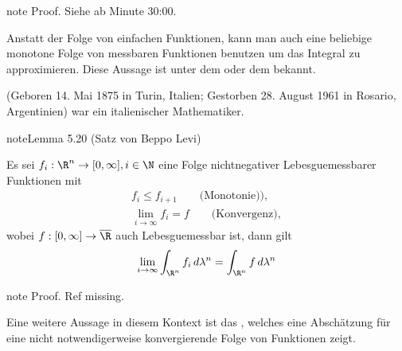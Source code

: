 \documentclass[letterpaper,10pt,german]{jupyterBook}
\begin{document}
\begin{sphinxadmonition}{note}
\sphinxAtStartPar
Proof. Siehe  ab Minute 30:00.
\end{sphinxadmonition}

\sphinxAtStartPar
Anstatt der Folge von einfachen Funktionen, kann man auch eine beliebige monotone Folge von messbaren Funktionen benutzen um das Integral zu approximieren. Diese Aussage ist unter dem  oder dem  bekannt.

\begin{sphinxShadowBox}

\sphinxAtStartPar
{} (Geboren 14. Mai 1875 in Turin, Italien; Gestorben 28. August 1961 in Rosario, Argentinien) war ein italienischer Mathematiker.
\end{sphinxShadowBox}
\label{masstheorie/lebesgue_integral:lem:levi}
\begin{sphinxadmonition}{note}{Lemma 5.20 (Satz von Beppo Levi)}



\sphinxAtStartPar
Es sei \(f_i:\R^n\to[0,\infty],i\in\N\) eine Folge nicht\sphinxhyphen{}negativer Lebesgue\sphinxhyphen{}messbarer Funktionen mit
\begin{equation*}
\begin{split}f_i\leq f_{i+1}\qquad\text{(Monotonie))},\\
\lim_{i\to\infty} f_i = f\qquad\text{(Konvergenz)},\end{split}
\end{equation*}
\sphinxAtStartPar
wobei \(f:[0,\infty]\to\overline{\R}\) auch Lebesgue\sphinxhyphen{}messbar ist, dann gilt
\begin{equation*}
\begin{split}\lim_{i\to\infty} \int_{\R^n} f_i \,d\lambda^n = \int_{\R^n} f \,d\lambda^n\end{split}
\end{equation*}\end{sphinxadmonition}

\begin{sphinxadmonition}{note}
\sphinxAtStartPar
Proof. Ref missing.
\end{sphinxadmonition}

\sphinxAtStartPar
Eine weitere Aussage in diesem Kontext ist das , welches eine Abschätzung für eine nicht notwendigerweise konvergierende Folge von Funktionen zeigt.
\end{document}
